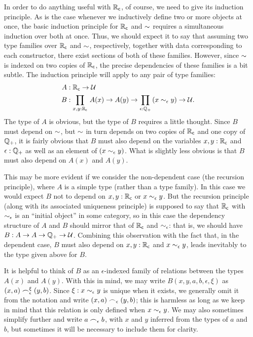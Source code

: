 In order to do anything useful with $\mathbb{R}_\mathsf{c}$, of course, we need to give its induction principle.
As is the case whenever we inductively define two or more objects at once, the basic induction principle for $\mathbb{R}_\mathsf{c}$ and $\mathord\sim$ requires a simultaneous induction over both at once.
Thus, we should expect it to say that assuming two type families over $\mathbb{R}_\mathsf{c}$ and $\mathord\sim$, respectively, together with data corresponding to each constructor, there exist sections of both of these families.
However, since $\mathord\sim$ is indexed on two copies of $\mathbb{R}_\mathsf{c}$, the precise dependencies of these families is a bit subtle.
The induction principle will apply to any pair of type families:
\begin{align*}
A&:\RC\to\type\\
B&:\prd{x,y:\RC} A(x) \to A(y) \to \prd{\epsilon:\Qp} (x\close\epsilon y) \to \type.
\end{align*}
The type of $A$ is obvious, but the type of $B$ requires a little thought.
Since $B$ must depend on $\mathord\sim$, but $\mathord\sim$ in turn depends on two copies of $\mathbb{R}_\mathsf{c}$ and one copy of $\mathbb{Q}_{+}$, it is fairly obvious that $B$ must also depend on the variables $x,y:\mathbb{R}_\mathsf{c}$ and $\epsilon:\mathbb{Q}_{+}$ as well as an element of $(x\sim_{\epsilon} y)$.
What is slightly less obvious is that $B$ must also depend on $A(x)$ and $A(y)$.

This may be more evident if we consider the non-dependent case (the recursion principle), where $A$ is a simple type (rather than a type family).
In this case we would expect $B$ not to depend on $x,y:\mathbb{R}_\mathsf{c}$ or $x\sim_{\epsilon} y$.
But the recursion principle (along with its associated uniqueness principle) is supposed to say that $\mathbb{R}_\mathsf{c}$ with $\sim_{\epsilon}$ is an ``initial object'' in some category, so in this case the dependency structure of $A$ and $B$ should mirror that of $\mathbb{R}_\mathsf{c}$ and $\sim_{\epsilon}$: that is, we should have $B:A\to A\to \mathbb{Q}_{+} \to \mathcal{U}$.
Combining this observation with the fact that, in the dependent case, $B$ must also depend on $x,y:\mathbb{R}_\mathsf{c}$ and $x\sim_{\epsilon} y$, leads inevitably to the type given above for $B$.

It is helpful to think of $B$ as an $\epsilon$-indexed family of relations between the types $A(x)$ and $A(y)$.
With this in mind, we may write $B(x,y,a,b,\epsilon,\xi)$ as $(x,a) \frown_\epsilon^\xi (y,b)$.
Since $\xi:x\sim_{\epsilon} y$ is unique when it exists, we generally omit it from the notation and write $(x,a) \frown_\epsilon (y,b)$; this is harmless as long as we keep in mind that this relation is only defined when $x\sim_{\epsilon} y$.
We may also sometimes simplify further and write $a\frown_\epsilon b$, with $x$ and $y$ inferred from the types of $a$ and $b$, but sometimes it will be necessary to include them for clarity.

